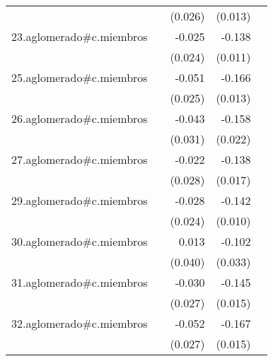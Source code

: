 {\begin{longtable}{l*{4}{D{.}{.}{-1}}}
            &                     &     (0.026)         &     (0.013)         &                     \\
\addlinespace
23.aglomerado#c.miembros&                     &      -0.025         &      -0.138\sym{***}&                     \\
            &                     &     (0.024)         &     (0.011)         &                     \\
\addlinespace
25.aglomerado#c.miembros&                     &      -0.051\sym{*}  &      -0.166\sym{***}&                     \\
            &                     &     (0.025)         &     (0.013)         &                     \\
\addlinespace
26.aglomerado#c.miembros&                     &      -0.043         &      -0.158\sym{***}&                     \\
            &                     &     (0.031)         &     (0.022)         &                     \\
\addlinespace
27.aglomerado#c.miembros&                     &      -0.022         &      -0.138\sym{***}&                     \\
            &                     &     (0.028)         &     (0.017)         &                     \\
\addlinespace
29.aglomerado#c.miembros&                     &      -0.028         &      -0.142\sym{***}&                     \\
            &                     &     (0.024)         &     (0.010)         &                     \\
\addlinespace
30.aglomerado#c.miembros&                     &       0.013         &      -0.102\sym{**} &                     \\
            &                     &     (0.040)         &     (0.033)         &                     \\
\addlinespace
31.aglomerado#c.miembros&                     &      -0.030         &      -0.145\sym{***}&                     \\
            &                     &     (0.027)         &     (0.015)         &                     \\
\addlinespace
32.aglomerado#c.miembros&                     &      -0.052         &      -0.167\sym{***}&                     \\
            &                     &     (0.027)         &     (0.015)         &                     \\

\end{longtable}}
